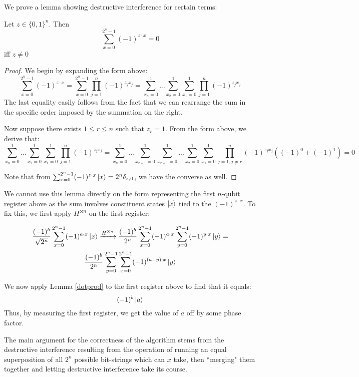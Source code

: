 \documentclass{../quantum.tex}
\begin{document}
We prove a lemma showing destructive interference for certain terms: \newline

\begin{lemma} \label{dotprod}
  Let $z \in \{0,1\}^n$. Then
  $$\sum_{x=0}^{2^n-1} (-1)^{z \cdot x} = 0$$ iff $z \neq 0$
\end{lemma}
\begin{proof}
   We begin by expanding the form above:
   $$\sum_{x=0}^{2^n-1} (-1)^{z \cdot x} = \sum_{x=0}^{2^n -1}\prod_{j=1}^n (-1)^{z_jx_j} = \sum_{x_n = 0}^1...\sum_{x_2 = 0}^1\sum_{x_1 = 0}^1 \prod_{j=1}^n (-1)^{z_jx_j}   $$
   The last equality easily follows from the fact that we can rearrange the sum in the specific order imposed by the summation on the right.

   Now suppose there exists $1 \leq r \leq n$ such that $z_r = 1$. From the form above, we derive that:
   $$\sum_{x_n = 0}^1...\sum_{x_2 = 0}^1\sum_{x_1 = 0}^1 \prod_{j=1}^n (-1)^{z_jx_j} = \sum_{x_n = 0}^1...\sum_{x_{r+1} = 0}^1\sum_{x_{r-1} = 0}^1... \sum_{x_2 = 0}^1\sum_{x_1 = 0}^1 \prod_{j=1,j \neq r}^n (-1)^{z_jx_j} ((-1)^0 + (-1)^1) = 0 $$

   Note that from $\sum_{x=0}^{2^n-1} (-1)^{z \cdot x} \ket{x} = 2^n\delta_{z,0}$, we have the converse as well.
\end{proof}

We cannot use this lemma directly on the form representing the first $n$-qubit register above as the sum involves constituent states $\ket{x}$ tied to the $(-1)^{z\cdot x}$. To fix this, we first apply $H^{\otimes n}$ on the first register:

\begin{gather}
  \frac{(-1)^b}{\sqrt{2^n}} \sum_{x=0}^{2^n-1}(-1)^{a\cdot x}\ket{x} \xrightarrow{H^{\otimes n}} \frac{(-1)^b}{2^n}\sum_{x=0}^{2^n -1}  (-1)^{a\cdot x} \sum_{y=0}^{2^n -1} (-1)^{y \cdot x} \ket{y} = \\
  \frac{(-1)^b}{2^n}\sum_{y=0}^{2^n -1} \sum_{x=0}^{2^n -1} (-1)^{(a+y)\cdot x} \ket{y}
\end{gather}

We now apply Lemma \ref{dotprod} to the first register above to find that it equals:
$$(-1)^b \ket{a} $$ Thus, by measuring the first register, we get the value of $a$ off by some phase factor.

The main argument for the correctness of the algorithm stems from the destructive interference resulting from the operation of running an equal superposition of all $2^n$ possible bit-strings which can $x$ take, then ``merging" them together and letting destructive interference take its course.
\end{document}
